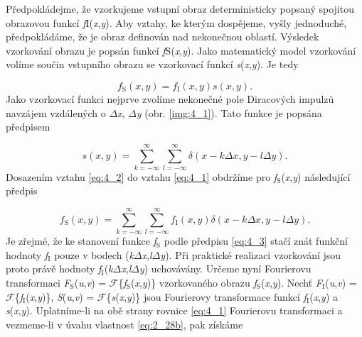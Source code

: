 Předpokládejme, že vzorkujeme vstupní obraz deterministicky popsaný spojitou obrazovou funkcí \textit{f}I(\textit{x},\textit{y}). Aby vztahy, ke kterým dospějeme, vyšly jednoduché, předpokládáme, že je obraz definován nad nekonečnou oblastí. Výsledek vzorkování obrazu je popsán funkcí \textit{f}S(\textit{x},\textit{y}). Jako matematický model vzorkování volíme součin vstupního obrazu se vzorkovací funkcí \textit{s}(\textit{x},\textit{y}). Je tedy

\begin{equation} \label{eq:4_1}
    f_\mathrm{S}(x, y) = f_\mathrm{I}(x, y) s(x, y).
\end{equation}
Jako vzorkovací funkci nejprve zvolíme nekonečné pole Diracových impulzů navzájem vzdálených o $\Delta$\textit{x}, $\Delta$\textit{y} (obr. \ref{img:4_1}). Tato funkce je popsána předpisem

\begin{equation} \label{eq:4_2}
    s(x, y) = \sum\limits_{k=-\infty}^{\infty} \sum\limits_{l=-\infty}^{\infty} \delta(x -k\Delta x, y - l\Delta y).
\end{equation}
Dosazením vztahu \eqref{eq:4_2} do vztahu \eqref{eq:4_1} obdržíme pro \textit{f}$_\mathrm{S}$(\textit{x},\textit{y}) následující předpis

\begin{equation} \label{eq:4_3}
    f_\mathrm{S}(x, y) = \sum\limits_{k=-\infty}^{\infty} \sum\limits_{l=-\infty}^{\infty} f_\mathrm{I}(x, y) \delta(x -k\Delta x, y - l\Delta y).
\end{equation}
Je zřejmé, že ke stanovení funkce \textit{f}$_\mathrm{S}$ podle předpisu \eqref{eq:4_3} stačí znát funkční hodnoty \textit{f}$_\mathrm{I}$ pouze v bodech (\textit{k}$\Delta$\textit{x},\textit{l}$\Delta$\textit{y}). Při praktické realizaci vzorkování jsou proto právě hodnoty \textit{f}$_\mathrm{I}$(\textit{k}$\Delta$\textit{x},\textit{l}$\Delta$\textit{y}) uchovávány. Určeme nyní Fourierovu transformaci \textit{F}$_\mathrm{S}$(\textit{u},\textit{v}) = $\mathscr{F}$\{\textit{f}$_\mathrm{S}$(\textit{x},\textit{y})\} vzorkovaného obrazu \textit{f}$_\mathrm{S}$(\textit{x},\textit{y}). Nechť \textit{F}$_\mathrm{I}$(\textit{u},\textit{v}) = $\mathscr{F}$\{\textit{f}$_\mathrm{I}$(\textit{x},\textit{y})\}, \textit{S}(\textit{u},\textit{v}) = $\mathscr{F}$\{\textit{s}(\textit{x},\textit{y})\} jsou Fourierovy transformace funkcí \textit{f}$_\mathrm{I}$(\textit{x},\textit{y}) a \textit{s}(\textit{x},\textit{y}). Uplatníme-li na obě strany rovnice \eqref{eq:4_1} Fourierovu transformaci a vezmeme-li v úvahu vlastnost \eqref{eq:2_28b}, pak získáme

